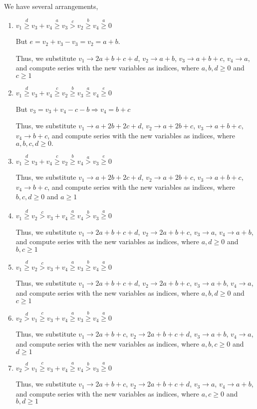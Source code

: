 \documentclass{article}
\begin{document}
We have several arrangements,
\begin{enumerate}
    \item 
$v_1\overset{d}{\geq}v_3+v_4\overset{a}{\geq}v_3\overset{c}{>}{v_2}\overset{b}{\geq}v_4\overset{a}{\geq}{0}$

But $e=v_2+v_3-v_3=v_2=a+b.$

Thus, we substitute 
$v_1\rightarrow{2a+b+c+d}$, 
$v_2\rightarrow{a+b}$, 
$v_3\rightarrow{a+b+c}$, 
$v_4\rightarrow{a}$, and compute series with the new variables as indices, where $a,b,d\geq{0}$ and $c\geq{1}$  
    \item 
$v_1\overset{d}{\geq}v_3+v_4\overset{c}{\geq}v_2\overset{b}{\geq}{v_3}\overset{a}{\geq}v_4\overset{e}{\geq}{0}$

But $v_3=v_3+v_4-c-b\Rightarrow{v_4=b+c}$

Thus, we substitute 
$v_1\rightarrow{a+2b+2c+d}$, 
$v_2\rightarrow{a+2b+c}$, 
$v_3\rightarrow{a+b+c}$, 
$v_4\rightarrow{b+c}$, and compute series with the new variables as indices, where $a,b,c,d\geq{0}.$

    \item 
$v_1\overset{d}{\geq}v_3+v_4\overset{c}{\geq}v_2\overset{b}{\geq}{v_4}\overset{a}>v_3\overset{e}{\geq}{0}$

Thus, we substitute 
$v_1\rightarrow{a+2b+2c+d}$, 
$v_2\rightarrow{a+2b+c}$, 
$v_3\rightarrow{a+b+c}$, 
$v_4\rightarrow{b+c}$, and compute series with the new variables as indices, where $b,c,d\geq{0}$ and $a\geq{1}$
    \item 
$v_1\overset{d}{\geq}v_2\overset{c}>v_3+v_4\overset{a}{\geq}{v_4}\overset{b}>v_3\overset{a}{\geq}{0}$

Thus, we substitute 
$v_1\rightarrow{2a+b+c+d}$, 
$v_2\rightarrow{2a+b+c}$, 
$v_3\rightarrow{a}$, 
$v_4\rightarrow{a+b}$, and compute series with the new variables as indices, where $a,d\geq{0}$ and $b,c\geq{1}$
    \item 
$v_1\overset{d}{\geq}v_2\overset{c}>v_3+v_4\overset{a}{\geq}{v_3}\overset{b}\geq{v_4}\overset{a}{\geq}{0}$

Thus, we substitute 
$v_1\rightarrow{2a+b+c+d}$, 
$v_2\rightarrow{2a+b+c}$, 
$v_3\rightarrow{a+b}$, 
$v_4\rightarrow{a}$, and compute series with the new variables as indices, where $a,b,d\geq{0}$ and $c\geq{1}$
\item 
$v_2\overset{d}>v_1\overset{c}{\geq}v_3+v_4\overset{a}{\geq}{v_3}\overset{b}\geq{v_4}\overset{a}{\geq}{0}$

Thus, we substitute 
$v_1\rightarrow{2a+b+c}$, 
$v_2\rightarrow{2a+b+c+d}$, 
$v_3\rightarrow{a+b}$, 
$v_4\rightarrow{a}$, and compute series with the new variables as indices, where $a,b,c\geq{0}$ and $d\geq{1}$
\item 
$v_2\overset{d}>v_1\overset{c}{\geq}v_3+v_4\overset{a}{\geq}{v_4}\overset{b}>{v_3}\overset{a}{\geq}{0}$

Thus, we substitute 
$v_1\rightarrow{2a+b+c}$, 
$v_2\rightarrow{2a+b+c+d}$, 
$v_3\rightarrow{a}$, 
$v_4\rightarrow{a+b}$, and compute series with the new variables as indices, where $a,c\geq{0}$ and $b,d\geq{1}$
\end{enumerate}
\end{document}
